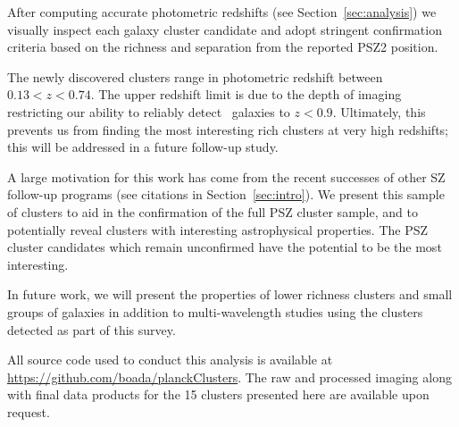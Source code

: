 \documentclass[apj, revtex4-1]{emulateapj}
\begin{document}
After computing accurate photometric redshifts (see Section~\ref{sec:analysis}) we visually inspect each galaxy cluster candidate and adopt stringent confirmation criteria based on the richness and separation from the reported PSZ2 position.

The newly discovered clusters range in photometric redshift between $0.13 < z < 0.74$. The upper redshift limit is due to the depth of imaging restricting our ability to reliably detect \lstar\ galaxies to $z<0.9$. Ultimately, this prevents us from finding the most interesting rich clusters at very high redshifts; this will be addressed in a future follow-up study.

A large motivation for this work has come from the recent successes of other SZ follow-up programs (see citations in Section~\ref{sec:intro}). We present this sample of clusters to aid in the confirmation of the full PSZ cluster sample, and to potentially reveal clusters with interesting astrophysical properties. The PSZ cluster candidates which remain unconfirmed have the potential to be the most interesting.

In future work, we will present the properties of lower richness clusters and small groups of galaxies in addition to multi-wavelength studies using the clusters detected as part of this survey.

All source code used to conduct this analysis is available at \url{https://github.com/boada/planckClusters}. The raw and processed imaging along with final data products for the 15 clusters presented here are available upon request.
\end{document}
